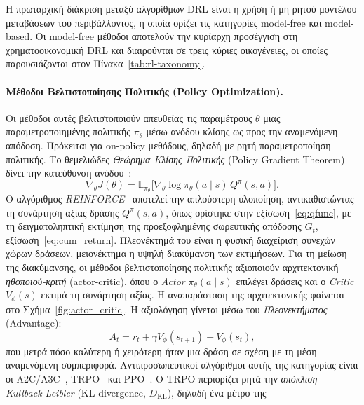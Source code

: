 Η πρωταρχική διάκριση μεταξύ αλγορίθμων DRL είναι η χρήση ή μη ρητού μοντέλου
μεταβάσεων του περιβάλλοντος, η οποία ορίζει τις κατηγορίες model-free και
model-based. Οι model-free μέθοδοι αποτελούν την κυρίαρχη προσέγγιση στη
χρηματοοικονομική DRL και διαιρούνται σε τρεις κύριες οικογένειες, οι οποίες
παρουσιάζονται στον Πίνακα~\ref{tab:rl-taxonomy}.

\paragraph{Μέθοδοι Βελτιστοποίησης Πολιτικής (Policy Optimization).}
Οι μέθοδοι αυτές βελτιστοποιούν απευθείας τις παραμέτρους $\theta$ μιας
παραμετροποιημένης πολιτικής $\pi_{\theta}$ μέσω ανόδου κλίσης ως προς την
αναμενόμενη απόδοση. Πρόκειται για on-policy μεθόδους, 
δηλαδή με ρητή παραμετροποίηση πολιτικής.
Το θεμελιώδες \emph{Θεώρημα Κλίσης Πολιτικής} (Policy Gradient
Theorem) δίνει την κατεύθυνση ανόδου~\cite{sutton1999policygradient}:
\begin{equation}
    \nabla_{\theta} J(\theta) = \mathbb{E}_{\pi_{\theta}}\!\Big[
    \nabla_{\theta} \log \pi_{\theta}(a \mid s)\, Q^{\pi}(s, a) \Big].
    \label{eq:policy-gradient}
\end{equation}
Ο αλγόριθμος \emph{REINFORCE}~\cite{williams1992reinforce} αποτελεί την
απλούστερη υλοποίηση, αντικαθιστώντας τη συνάρτηση αξίας δράσης
$Q^{\pi}(s,a)$, όπως ορίστηκε στην εξίσωση~\ref{eq:qfunc}, με τη
δειγματοληπτική εκτίμηση της προεξοφλημένης σωρευτικής απόδοσης
$G_t$, εξίσωση~\ref{eq:cum_return}. Πλεονέκτημά του είναι η
φυσική διαχείριση συνεχών χώρων δράσεων, μειονέκτημα η υψηλή διακύμανση
των εκτιμήσεων. Για τη μείωση της διακύμανσης, οι μέθοδοι βελτιστοποίησης
πολιτικής αξιοποιούν αρχιτεκτονική \emph{ηθοποιού-κριτή} (actor-critic),
όπου ο \emph{Actor} $\pi_{\theta}(a \mid s)$ επιλέγει δράσεις και ο
\emph{Critic} $V_{\phi}(s)$ εκτιμά τη συνάρτηση αξίας. 
Η αναπαράσταση της αρχιτεκτονικής φαίνεται στο Σχήμα~\ref{fig:actor_critic}. 
Η αξιολόγηση γίνεται μέσω του \emph{Πλεονεκτήματος} (Advantage):
\begin{equation}
    A_t = r_t + \gamma V_{\phi}(s_{t+1}) - V_{\phi}(s_t),
    \label{eq:advantage}
\end{equation}
που μετρά πόσο καλύτερη ή χειρότερη ήταν μια δράση σε σχέση με τη μέση
αναμενόμενη συμπεριφορά. Αντιπροσωπευτικοί αλγόριθμοι αυτής της κατηγορίας
είναι οι A2C/A3C~\cite{mnih2016a3c}, TRPO~\cite{schulman2015trpo} και
PPO~\cite{schulman2017ppo}. Ο TRPO περιορίζει ρητά την \emph{απόκλιση
Kullback-Leibler} (KL divergence, $D_{\mathrm{KL}}$), δηλαδή ένα μέτρο της
